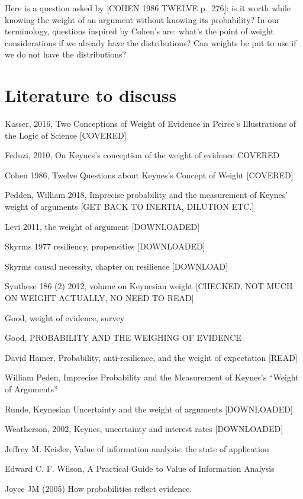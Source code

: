 \documentclass[
  10pt,
  dvipsnames,enabledeprecatedfontcommands]{scrartcl}
\begin{document}
Here is a question asked by {[}COHEN 1986 TWELVE p.~276{]}: is it worth
while knowing the weight of an argument without knowing its probability?
In our terminology, questions inspired by Cohen's are: what's the point
of weight considerations if we already have the distributions? Can
weights be put to use if we do not have the distributions?

\hypertarget{literature-to-discuss}{%
\section{Literature to discuss}\label{literature-to-discuss}}

Kasser, 2016, Two Conceptions of Weight of Evidence in Peirce's
Illustrations of the Logic of Science {[}COVERED{]}

Feduzi, 2010, On Keynes's conception of the weight of evidence COVERED

Cohen 1986, Twelve Questions about Keynes's Concept of Weight
{[}COVERED{]}

Pedden, William 2018, Imprecise probability and the measurement of
Keynes' weight of arguments {[}GET BACK TO INERTIA, DILUTION ETC.{]}

Levi 2011, the weight of argument {[}DOWNLOADED{]}

Skyrms 1977 resiliency, propensities {[}DOWNLOADED{]}

Skyrms causal necessity, chapter on resilience {[}DOWNLOAD{]}

Synthese 186 (2) 2012, volume on Keynesian weight {[}CHECKED, NOT MUCH
ON WEIGHT ACTUALLY, NO NEED TO READ{]}

Good, weight of evidence, survey

Good, PROBABILITY AND THE WEIGHING OF EVIDENCE

David Hamer, Probability, anti-resilience, and the weight of expectation
{[}READ{]}

William Peden, Imprecise Probability and the Measurement of Keynes's
``Weight of Arguments''

Runde, Keynesian Uncertainty and the weight of arguments
{[}DOWNLOADED{]}

Weatherson, 2002, Keynes, uncertainty and interest rates
{[}DOWNLOADED{]}

Jeffrey M. Keisler, Value of information analysis: the state of
application

Edward C. F. Wilson, A Practical Guide to Value of Information Analysis

Joyce JM (2005) How probabilities reflect evidence.
\end{document}

